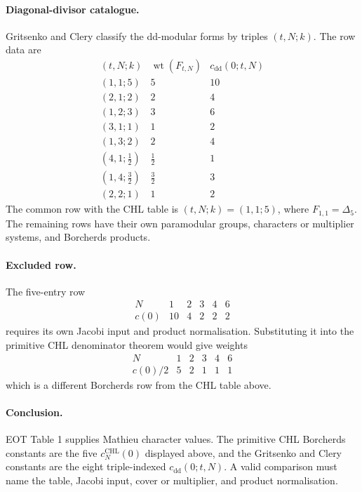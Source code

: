 \paragraph{Diagonal-divisor catalogue.}
Gritsenko and Clery classify the dd-modular forms by triples
\((t,N;k)\). The row data are
\[
\begin{array}{c|c|c}
(t,N;k) & \operatorname{wt}(F_{t,N}) & c_{\mathrm{dd}}(0;t,N)\\ \hline
(1,1;5) & 5 & 10\\
(2,1;2) & 2 & 4\\
(1,2;3) & 3 & 6\\
(3,1;1) & 1 & 2\\
(1,3;2) & 2 & 4\\
(4,1;\tfrac12) & \tfrac12 & 1\\
(1,4;\tfrac32) & \tfrac32 & 3\\
(2,2;1) & 1 & 2
\end{array}
\]
The common row with the CHL table is \((t,N;k)=(1,1;5)\), where
\(F_{1,1}=\Delta_5\). The remaining rows have their own paramodular
groups, characters or multiplier systems, and Borcherds products.

\paragraph{Excluded row.}
The five-entry row
\[
\begin{array}{c|ccccc}
N & 1 & 2 & 3 & 4 & 6\\ \hline
c(0) & 10 & 4 & 2 & 2 & 2
\end{array}
\]
requires its own Jacobi input and product normalisation. Substituting it
into the primitive CHL denominator theorem would give weights
\[
\begin{array}{c|ccccc}
N & 1 & 2 & 3 & 4 & 6\\ \hline
c(0)/2 & 5 & 2 & 1 & 1 & 1
\end{array}
\]
which is a different Borcherds row from the CHL table above.

\paragraph{Conclusion.}
EOT Table 1 supplies Mathieu character values. The primitive CHL
Borcherds constants are the five \(c_N^{\mathrm{CHL}}(0)\) displayed
above, and the Gritsenko and Clery constants are the eight
triple-indexed \(c_{\mathrm{dd}}(0;t,N)\). A valid comparison must name
the table, Jacobi input, cover or multiplier, and product normalisation.

